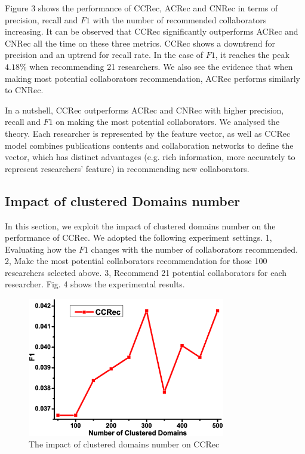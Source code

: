 \documentclass[review]{elsarticle}
\begin{document}
Figure 3 shows the performance of CCRec, ACRec and CNRec in terms of precision, recall and $F1$ with the number of recommended collaborators increasing. It can be observed that CCRec significantly outperforms ACRec and CNRec all the time on these three metrics. CCRec shows a downtrend for precision and an uptrend for recall rate. In the case of $F1$, it reaches the peak $4.18\%$ when recommending 21 researchers. We also see the evidence that when making most potential collaborators recommendation, ACRec performs similarly to CNRec.

In a nutshell, CCRec outperforms ACRec and CNRec with higher precision, recall and $F1$ on making the most potential collaborators. We analysed the theory. Each researcher is represented by the feature vector, as well as CCRec model combines publications contents and collaboration networks to define the vector, which has distinct advantages (e.g. rich information, more accurately to represent researchers' feature) in recommending new collaborators.

\subsection{Impact of clustered Domains number}
In this section, we exploit the impact of clustered domains number on the performance of CCRec. We adopted the following experiment settings. 1, Evaluating how the $F1$ changes with the number of collaborators recommended. 2, Make the most potential collaborators recommendation for those 100 researchers selected above. 3, Recommend 21 potential collaborators for each researcher. Fig. 4 shows the experimental results.

\begin{figure}
\centering
\includegraphics [width=3.4in]{Fig4.eps}
\caption{The impact of clustered domains number on CCRec}
\end{figure}
\end{document}

